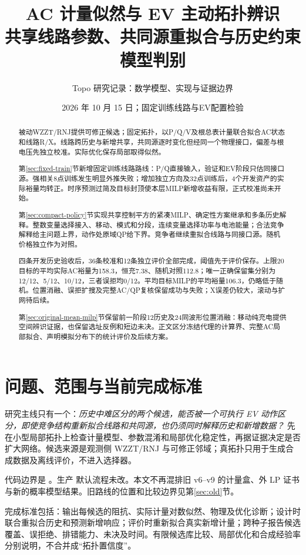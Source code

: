 \documentclass[UTF8,fontset=fandol,11pt,a4paper]{ctexart}
\title{AC 计量似然与 EV 主动拓扑辨识\\[4pt]
\large 共享线路参数、共同源重拟合与历史约束模型判别}
\author{Topo 研究记录：数学模型、实现与证据边界}
\date{2026 年 10 月 15 日；固定训练线路与EV配置检验}
\begin{document}
\maketitle
\begin{abstract}
被动WZZT/RNJ提供可修正候选；固定拓扑，以P/Q/V及根总表计量联合拟合AC状态和线路R/X。线路跨历史与新增共享，共同源逐时变化但经同一个物理接口，偏差与根电压先独立校准。实际优化保存局部取得似然。

第\ref{sec:fixed-train}节新增固定训练线路路线：P/Q直接输入，验证和EV阶段只估同接口源。强相关8点训练发生明显外推失败；增加独立方向及32点训练后，4个开发资产的实际裕量均转正。时序预测过简及目标封顶使本层MILP新增收益有限，正式校准尚未开始。

第\ref{sec:compact-policy}节实现共享控制平方的紧凑MILP、确定性方案继承和多条历史解释。整数变量选择接入、移动、模式和分段，连续变量选择功率与电池能量；合法竞争解释给主问题上界，动作处原域QP给下界。竞争者继续重拟合线路与同接口源。随机价格独立作为对照。

四条开发历史验收后，36条校准和12条独立评价全部完成，阈值先于评价保存。上限20目标的平均实际AC裕量为158.3，恒充7.38、随机对照112.8；唯一正确保留集分别为12/12、5/12、10/12，三者误拒均0/12。平均目标MILP的平均裕量106.3，仍略低于随机。位置消融、误拒扩搜及完整AC/QP复核保留成功与失败；X误差仍较大，滚动与扩网待后续。

第\ref{sec:original-mean-milp}节保留前一阶段12历史及24同波形位置消融：移动纯充电提供空间辨识证据，也保留选址反例和短边未决。正文区分冻结代理的计算界、完整AC局部拟合、声明模拟分布下的统计评价及后续方案。
\end{abstract}
\tableofcontents

\section{问题、范围与当前完成标准}
\label{sec:scope}
研究主线只有一个：\emph{历史中难区分的两个候选，能否被一个可执行 EV 动作区分，即使竞争结构重新拟合线路和共同源，也仍须同时解释历史和新增数据？}
先在小型局部拓扑上检查计量模型、参数混淆和局部优化稳定性，再据证据决定是否扩大网络。候选来源是观测侧 WZZT/RNJ 与可修正邻域；真拓扑只用于生成合成数据及离线评价，不进入选择器。

代码边界是 。生产  默认流程未改。本文不再混排旧 v6--v9 的计量盒、外 LP 证书与新的概率模型结果。旧路线的位置和比较边界见第\ref{sec:old}节。

完成标准包括：输出每候选的阻抗、实际计量对数似然、物理及优化诊断；设计时联合重拟合历史和预测新增响应；评价时重新拟合真实新增计量；跨种子报告候选覆盖、误拒绝、排错能力、未决及时间。有限候选库比较、局部优化和合成经验率分别说明，不合并成“拓扑置信度”。
\end{document}
